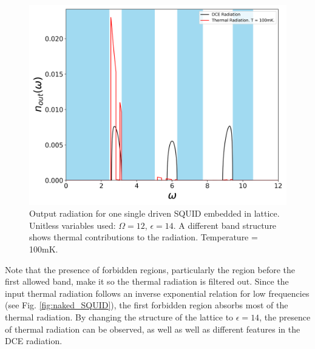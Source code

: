 %
\begin{figure}[h]
    \centering
    \includegraphics[width=\textwidth, keepaspectratio]{figures/results/one_SQUID_active_epsilon_14_100mK.png}
    \caption{Output radiation for one single driven SQUID embedded in lattice. Unitless variables used: $\Omega=12$, $\epsilon=14$. A different band structure shows thermal contributions to the radiation. Temperature = 100mK.}
    \label{fig:one_SQUID_active_e_14_T_100}
\end{figure}
%
Note that the presence of forbidden regions, particularly the region before the first allowed band, make it so the thermal radiation is filtered out. Since the input thermal radiation follows an inverse exponential relation for low frequencies (see Fig. \ref{fig:naked_SQUID}), the first forbidden region absorbs most of the thermal radiation. By changing the structure of the lattice to $\epsilon = 14$, the presence of thermal radiation can be observed, as well as well as different features in the DCE radiation.
%
